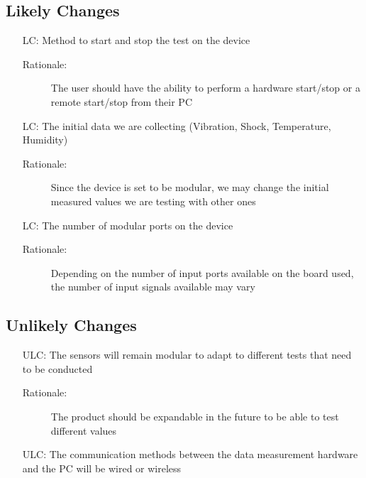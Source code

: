 \documentclass[12pt]{article}
\newcounter{lcnum} %
\newcounter{ulcnum}
\begin{document}
\subsection{Likely Changes}    

\noindent \begin{itemize}
\item[LC\refstepcounter{lcnum}\thelcnum:] Method to start and stop the test on the device
\begin{description} \item[Rationale:] The user should have the ability to perform a hardware start/stop or a remote start/stop from their PC \end{description}

\item[LC\refstepcounter{lcnum}\thelcnum:] The initial data we are collecting (Vibration, Shock, Temperature, Humidity)
\begin{description} \item[Rationale:] Since the device is set to be modular, we may change the initial measured values we are testing with other ones \end{description}

\item[LC\refstepcounter{lcnum}\thelcnum:] The number of modular ports on the device
\begin{description} \item[Rationale:] Depending on the number of input ports available on the board used, the number of input signals available may vary \end{description}


\end{itemize}

\subsection{Unlikely Changes}    

\noindent \begin{itemize}

\item[ULC\refstepcounter{ulcnum}\theulcnum:] The sensors will remain modular to adapt to different tests that need to be conducted
\begin{description} \item[Rationale:] The product should be expandable in the future to be able to test different values \end{description}

\item[ULC\refstepcounter{ulcnum}\theulcnum:] The communication methods between the data measurement hardware and the PC will be wired or wireless


\end{itemize}
\end{document}
